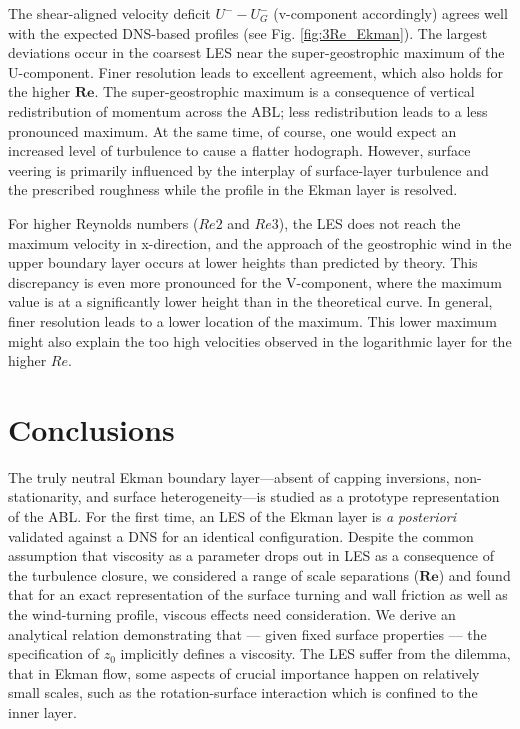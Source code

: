 \documentclass[smallcondensed,draft]{svjour3}
\newcommand{\RE}{\mathbf{Re}}
\begin{document}
The shear-aligned velocity deficit $U^--U^-_G$ (v-component accordingly) agrees well with the expected DNS-based profiles (see Fig. \ref{fig:3Re_Ekman}). The largest deviations occur in the coarsest LES near the super-geostrophic maximum of the U-component. Finer resolution leads to excellent agreement, which also holds for the higher $\RE$. The super-geostrophic maximum is a consequence of vertical redistribution of momentum across the ABL; less redistribution leads to a less pronounced maximum. At the same time, of course, one would expect an increased level of turbulence to cause a flatter hodograph. However, surface veering is primarily influenced by the interplay of surface-layer turbulence and the prescribed roughness while the profile in the Ekman layer is resolved.

For higher Reynolds numbers ($Re2$ and $Re3$), the LES does not reach the maximum velocity in x-direction, and the approach of the geostrophic wind in the upper boundary layer occurs at lower heights than predicted by theory. This discrepancy is even more pronounced for the V-component, where the maximum value is at a significantly lower height than in the theoretical curve. In general, finer resolution leads to a lower location of the maximum. This lower maximum might also explain the too high velocities observed in the logarithmic layer for the higher $Re$.


\section{Conclusions}
\label{conclusion}

The truly neutral Ekman boundary layer---absent of capping inversions, non-statio\-narity, and surface heterogeneity---is studied as a prototype representation of the ABL. For the first time, an LES of the Ekman layer is \emph{a posteriori} validated against a DNS for an identical configuration. Despite the common assumption that viscosity as a parameter drops out in LES as a consequence of the turbulence closure, we considered a range of scale separations ($\RE$) and found that for an exact representation of the surface turning and wall friction as well as the wind-turning profile, viscous effects need consideration. We derive an analytical relation demonstrating that --- given fixed surface properties --- the specification of $z_0$ implicitly defines a viscosity. The LES suffer from the dilemma, that in Ekman flow, some aspects of crucial importance happen on relatively small scales, such as the rotation-surface interaction which is confined to the inner layer.
\end{document}
